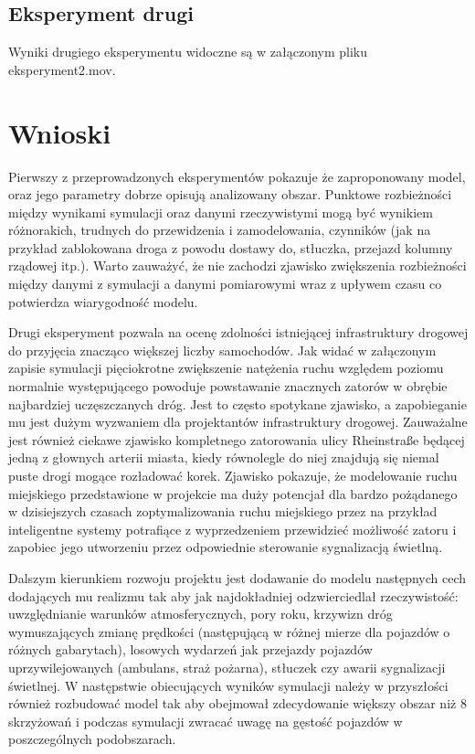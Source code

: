 \documentclass[a4paper,12pt]{article}
\begin{document}
\subsection*{Eksperyment drugi}
Wyniki drugiego eksperymentu widoczne są w załączonym pliku eksperyment2.mov.

\newpage
\section{Wnioski}
Pierwszy z przeprowadzonych eksperymentów pokazuje że zaproponowany model, oraz jego parametry dobrze opisują analizowany obszar. Punktowe rozbieżności między wynikami symulacji oraz danymi rzeczywistymi mogą być wynikiem różnorakich, trudnych do przewidzenia i zamodelowania, czynników (jak na przykład zablokowana droga z powodu dostawy do, stłuczka, przejazd kolumny rządowej itp.). Warto zauważyć, że nie zachodzi zjawisko zwiększenia rozbieżności między danymi z symulacji a danymi pomiarowymi wraz z upływem czasu co potwierdza wiarygodność modelu.

Drugi eksperyment pozwala na ocenę zdolności istniejącej infrastruktury drogowej do przyjęcia znacząco większej liczby samochodów. Jak widać w załączonym zapisie symulacji pięciokrotne zwiększenie natężenia ruchu względem poziomu normalnie występującego powoduje powstawanie znacznych zatorów w obrębie najbardziej uczęszczanych dróg. Jest to często spotykane zjawisko, a zapobieganie mu jest dużym wyzwaniem dla projektantów infrastruktury drogowej. Zauważalne jest również ciekawe zjawisko kompletnego zatorowania ulicy Rheinstraße będącej jedną z głownych arterii miasta, kiedy równolegle do niej znajdują się niemal puste drogi mogące rozładować korek. Zjawisko pokazuje, że modelowanie ruchu miejskiego przedstawione w projekcie ma duży potencjał dla bardzo pożądanego w dzisiejszych czasach zoptymalizowania ruchu miejskiego przez na przykład inteligentne systemy potrafiące z wyprzedzeniem przewidzieć możliwość zatoru i zapobiec jego utworzeniu przez odpowiednie sterowanie sygnalizacją świetlną.
	
Dalszym kierunkiem rozwoju projektu jest dodawanie do modelu następnych cech dodających mu realizmu tak aby jak najdokładniej odzwierciedlał rzeczywistość: uwzględnianie warunków atmosferycznych, pory roku, krzywizn dróg wymuszających zmianę prędkości (następującą w różnej mierze dla pojazdów o różnych gabarytach), losowych wydarzeń jak przejazdy pojazdów uprzywilejowanych (ambulans, straż pożarna), stłuczek czy awarii sygnalizacji świetlnej. W następstwie obiecujących wyników symulacji należy w przyszłości również rozbudować model tak aby obejmował zdecydowanie większy obszar niż 8 skrzyżowań i podczas symulacji zwracać uwagę na gęstość pojazdów w poszczególnych podobszarach.


\newpage



\end{document}
